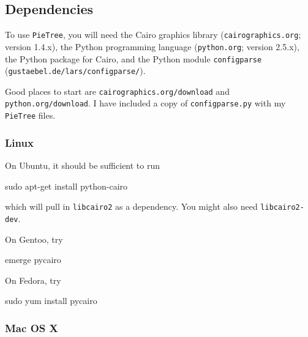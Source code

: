 \documentclass[10pt]{article}
\newcommand{\PT}{\texttt{PieTree}\xspace}
\begin{document}
\subsection*{Dependencies}

To use \PT, you will need the Cairo graphics library (\texttt{cairographics.org}; version 1.4.x), the Python programming language (\texttt{python.org}; version 2.5.x), the Python package for Cairo, and the Python module \texttt{configparse} (\texttt{gustaebel.de/lars/configparse/}).

Good places to start are \texttt{cairographics.org/download} and \texttt{python.org/download}.
I have included a copy of \texttt{configparse.py} with my \PT files.


\subsubsection*{Linux}

On Ubuntu, it should be sufficient to run
\begin{commandis}
	sudo apt-get install python-cairo
\end{commandis}
which will pull in \texttt{libcairo2} as a dependency.
You might also need \texttt{libcairo2-dev}.

On Gentoo, try
\begin{commandis}
	emerge pycairo
\end{commandis}

On Fedora, try
\begin{commandis}
	sudo yum install pycairo
\end{commandis}


\subsubsection*{Mac OS X}
\end{document}
